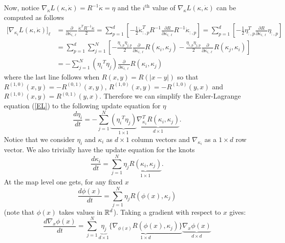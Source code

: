 \documentclass[noinfoline]{imsart}
\begin{document}
{Now, notice  $ \nabla_{\dot\kappa} L(\kappa,\dot \kappa) = R^{-1}\dot \kappa = \eta$ and the $i^\text{th}$ value of $\nabla_{\kappa} L(\kappa,\dot \kappa) $ can be computed as follows
\begin{align*}
\bigl[\nabla_{\kappa_i} L(\kappa,\dot \kappa)]_{\ell} & = \frac{\partial}{ \partial \kappa_{i,\ell}} \frac{ \dot\kappa^T R^{-1} \dot\kappa}{2}  = \sum_{p=1}^d \left[-\frac{1}{2} \dot\kappa^T_{:,p} R^{-1} \frac{\partial R}{\partial \kappa_{i,\ell}}  R^{-1} \dot\kappa_{:,p} \right] = \sum_{p=1}^d  \left[-\frac{1}{2} \eta_{:,p}^T \frac{\partial R}{\partial \kappa_{i,\ell}}  \eta_{:,p} \right]\\
&= \sum_{p=1}^d \sum_{j=1}^N \left[-\frac{\eta_{i,p} \eta_{j,p}}{2} \frac{\partial }{\partial \kappa_{i,\ell}}R(\kappa_i,\kappa_j)  -\frac{\eta_{i,p} \eta_{j,p }}{2}  \frac{\partial }{\partial \kappa_{i,\ell}}R(\kappa_j,\kappa_i)   \right]\\
&= -\sum_{j=1}^N ({\eta_i}^T \eta_j) \frac{\partial }{\partial \kappa_{i,\ell}}R(\kappa_i,\kappa_j)
\end{align*}
where the last line follows when $R(x,y) = R(|x-y|)$ so that $R^{(1,0)}(x,y)= - R^{(0,1)}(x,y)$, $R^{(1,0)}(x,y)= - R^{(1,0)}(y,x)$ and $R^{(1,0)}(x,y)=  R^{(0,1)}(y,x)$.
Therefore we can simplify the Euler-Lagrange equation (\ref{EL}) to the following update equation for $\eta$
\begin{equation}
\label{updateEta}
\frac{d\eta_i}{dt} = - \sum_{j=1}^N \underbrace{({\eta_i}^T\eta_j)}_{1\times 1}\underbrace{ \nabla^T_{\kappa_i}R(\kappa_i,\kappa_j)}_{d\times 1}. \end{equation}
Notice that we consider $\eta_i$ and $\kappa_i$ as $d\times 1$ column vectors and $\nabla_{\kappa_i}$ as a $1\times d$ row vector.
We also trivially have the update equation for the knots
\begin{equation}
\label{updateKnots}
\frac{d\kappa_i}{dt}=\sum_{j=1}^N \eta_j \underbrace{R(\kappa_i,\kappa_j)}_{1\times 1} .
\end{equation}
At the map level one gets, for any fixed $x$
\begin{equation}
\frac{d\phi(x)}{dt} = \sum_{j=1}^N \eta_j R(\phi(x),\kappa_j)
\end{equation}
 (note that $\phi(x)$ takes values in $\Bbb R^d$).
Taking a gradient with respect to $x$ gives:
\begin{equation}
\frac{d\nabla_x\phi(x)}{dt} = \sum_{j=1}^N \underbrace{\eta_j}_{d\times 1} \underbrace{\{ \nabla_{\phi(x)}R(\phi(x),\kappa_j)\}}_{1\times d} \underbrace{ \nabla_x {\phi(x)}}_{d\times d}
\end{equation}


}
\end{document}
